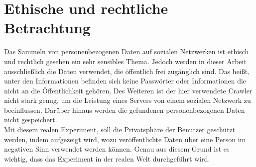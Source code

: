 \chapter{Ethische und rechtliche Betrachtung}  %
\label{cha:EthischeUndRechtlicheBetrachtung} %
Das Sammeln von personenbezogenen Daten auf sozialen Netzwerken ist ethisch und rechtlich gesehen ein sehr sensibles Thema. Jedoch werden in dieser Arbeit ausschließlich die Daten verwendet, die öffentlich frei zugänglich sind. Das heißt, unter den Informationen befinden sich keine Passwörter oder Informationen die nicht an die Öffentlichkeit gehören. Des Weiteren ist der hier verwendete Crawler nicht stark genug, um die Leistung eines Servers von einem sozialen Netzwerk zu beeinflussen. Darüber hinaus werden die gefundenen personenbezogenen Daten nicht gespeichert.\\
Mit diesem realen Experiment, soll die Privatsphäre der Benutzer geschützt werden, indem aufgezeigt wird, wozu veröffentlichte Daten über eine Person im negativen Sinn verwendet werden können. Genau aus diesem Grund ist es wichtig, dass das Experiment in der realen Welt durchgeführt wird.\\